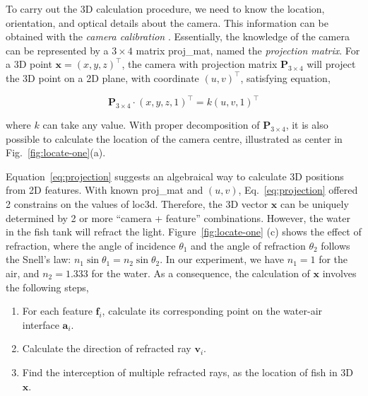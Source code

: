 \documentclass[11pt,twoside]{report}
\begin{document}
To carry out the 3D calculation procedure, we need to know the location, orientation, and optical details about the camera. This information can be obtained with the \emph{camera calibration} \cite{zhang2000, hartley2003}.
Essentially, the knowledge of the camera can be represented by a $3 \times 4$ matrix \gls{proj_mat}, named the \emph{projection matrix}. For a 3D point $\mathbf{x} = (x, y, z)^\top$, the camera with projection matrix $\mathbf{P}_{3 \times 4}$ will project the 3D point on a 2D plane, with coordinate $(u, v)^\top$, satisfying  equation,

\begin{equation}
	\mathbf{P}_{3 \times 4}
	\cdot (x, y, z, 1)^\top = k (u, v, 1)^\top
\label{eq:projection}
\end{equation}

\noindent where $k$ can take any value.
With proper decomposition of $\mathbf{P}_{3 \times 4}$, it is also possible to calculate the location of the camera centre, illustrated as \gls{center} in Fig.~\ref{fig:locate-one}(a).

 Equation~\ref{eq:projection} suggests an algebraical way to calculate 3D positions from 2D features. With known \gls{proj_mat} and $(u, v)$, Eq.~\ref{eq:projection} offered 2 constrains on the values of \gls{loc3d}. Therefore, the 3D vector $\mathbf{x}$ can be uniquely determined by 2 or more ``camera + feature'' combinations. However, the water in the fish tank will refract the light. Figure~\ref{fig:locate-one} (c) shows the effect of refraction, where the angle of incidence $\theta_1$ and the angle of refraction $\theta_2$ follows the Snell's law: $n_1 \sin\theta_1 = n_2 \sin\theta_2$. In our experiment, we have $n_1 = 1$ for the air, and $n_2 = 1.333$ for the water. As a consequence, the calculation of $\mathbf{x}$ involves the following steps,
 
 \begin{enumerate}
 	\item For each feature $\mathbf{f}_i$, calculate its corresponding point on the water-air interface $\mathbf{a}_i$.
 	\item Calculate the direction of refracted ray $\mathbf{v}_i$.
 	\item Find the interception of multiple refracted rays, as the location of fish in 3D $\mathbf{x}$.
 \end{enumerate}
\end{document}
